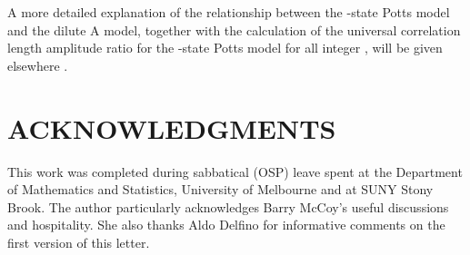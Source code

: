 \documentclass[a4paper,a4paper]{article}
\begin{document}
A more detailed explanation of the relationship between the \coordHE{}-state
Potts model and the dilute A model, together with the calculation 
of the universal correlation length amplitude
ratio \coordHE{} for the \coordHE{}-state Potts model for all integer \coordHE{}, will be given elsewhere \cite{kas2}.





\section*{ACKNOWLEDGMENTS}
This work was completed during sabbatical (OSP) leave
spent at the Department of Mathematics and Statistics, University
of Melbourne and at SUNY Stony Brook. The author particularly acknowledges
Barry McCoy's useful discussions and hospitality. She also thanks
Aldo Delfino for informative comments on the first version of this letter.

\end{document}
